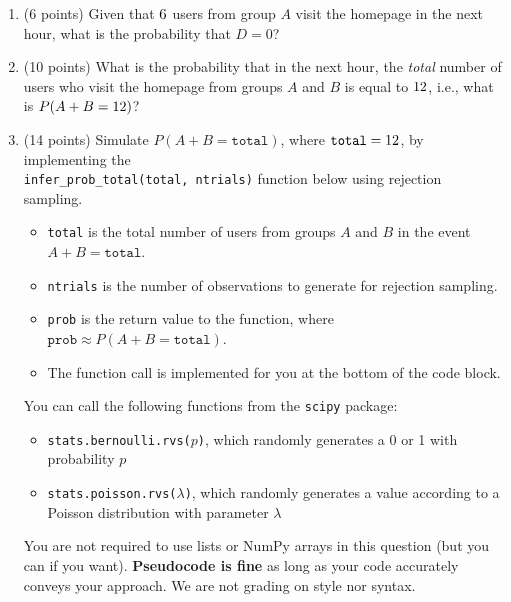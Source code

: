 \begin{enumerate}[label=\alph*.]

\item (6 points) Given that $6$ users from group $A$ visit the homepage in the next hour, what is the probability that $D = 0$?
	
		
		

\item (10 points) What is the probability that in the next hour, the \textit{total} number of users who visit the homepage from groups $A$ and $B$ is equal to $12$, i.e., what is $P(A + B = 12{})$?
	


		
		\item (14 points) Simulate $P(A + B = \texttt{total})$, where $\texttt{total} = 12{}$, by implementing the \\ \texttt{infer\_prob\_total(total, ntrials)} function below using rejection sampling.
		\begin{itemize}[itemsep=0pt]
			\item \texttt{total} is the total number of users from groups $A$ and $B$ in the event $A + B = \texttt{total}$.
			\item \texttt{ntrials} is the number of observations to generate for rejection sampling.
			\item \texttt{prob} is the return value to the function, where $\texttt{prob} \approx P(A + B = \texttt{total})$.
			\item The function call is implemented for you at the bottom of the code block.
		\end{itemize}
		You can call the following functions from the \texttt{scipy} package:
		\begin{itemize}[itemsep=0pt]
		\item \texttt{stats.bernoulli.rvs($p$)}, which randomly generates a 0 or 1 with probability $p$
		\item \texttt{stats.poisson.rvs($\lambda$)}, which randomly generates a value according to a Poisson distribution with parameter $\lambda$
		\end{itemize}
		You are not required to use lists or NumPy arrays in this question (but you can if you want). \textbf{Pseudocode is fine} as long as your code accurately conveys your approach. We are not grading on style nor syntax.
		
		
\end{enumerate}